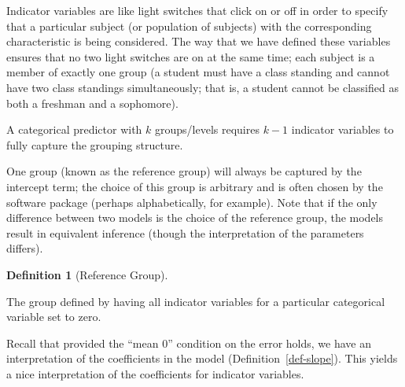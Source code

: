 \documentclass[
  letterpaper,
  DIV=11,
  numbers=noendperiod]{scrreprt}
\theoremstyle{definition}
\theoremstyle{definition}
\newtheorem{definition}{Definition}[chapter]
\theoremstyle{remark}
\begin{document}
Indicator variables are like light switches that click on or off in
order to specify that a particular subject (or population of subjects)
with the corresponding characteristic is being considered. The way that
we have defined these variables ensures that no two light switches are
on at the same time; each subject is a member of exactly one group (a
student must have a class standing and cannot have two class standings
simultaneously; that is, a student cannot be classified as both a
freshman and a sophomore).

\begin{tcolorbox}[enhanced jigsaw, bottomrule=.15mm, titlerule=0mm, bottomtitle=1mm, colback=white, coltitle=black, rightrule=.15mm, leftrule=.75mm, toprule=.15mm, toptitle=1mm, left=2mm, opacityback=0, colframe=quarto-callout-note-color-frame, breakable, title=\textcolor{quarto-callout-note-color}{\faInfo}\hspace{0.5em}{Note}, arc=.35mm, colbacktitle=quarto-callout-note-color!10!white, opacitybacktitle=0.6]

A categorical predictor with \(k\) groups/levels requires \(k-1\)
indicator variables to fully capture the grouping structure.

\end{tcolorbox}

One group (known as the reference group) will always be captured by the
intercept term; the choice of this group is arbitrary and is often
chosen by the software package (perhaps alphabetically, for example).
Note that if the only difference between two models is the choice of the
reference group, the models result in equivalent inference (though the
interpretation of the parameters differs).

\begin{definition}[Reference
Group]\protect\hypertarget{def-reference-group}{}\label{def-reference-group}

The group defined by having all indicator variables for a particular
categorical variable set to zero.

\end{definition}

Recall that provided the ``mean 0'' condition on the error holds, we
have an interpretation of the coefficients in the model
(Definition~\ref{def-slope}). This yields a nice interpretation of the
coefficients for indicator variables.
\end{document}
